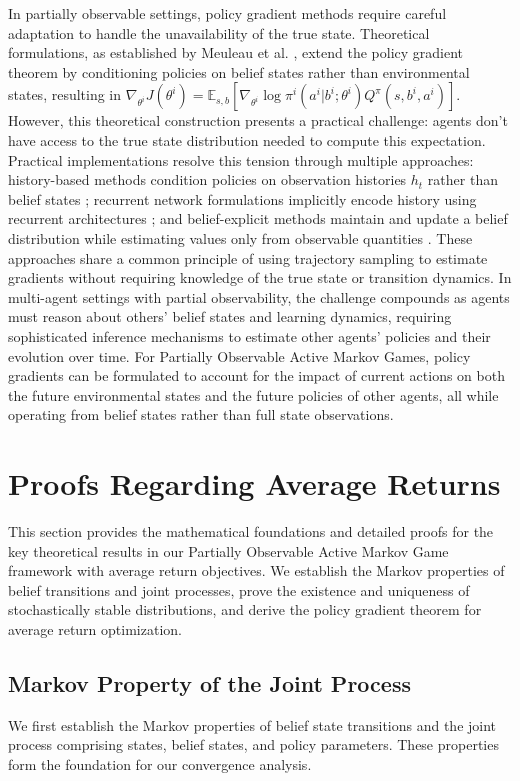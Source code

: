 In partially observable settings, policy gradient methods require careful adaptation to handle the unavailability of the true state. Theoretical formulations, as established by Meuleau et al. \cite{meuleau1999pomdp}, extend the policy gradient theorem by conditioning policies on belief states rather than environmental states, resulting in $\nabla_{\theta^i} J(\theta^i) = \mathbb{E}_{s,b} \left[ \nabla_{\theta^i} \log \pi^i(a^i|b^i; \theta^i) Q^{\pi}(s,b^i,a^i) \right]$. However, this theoretical construction presents a practical challenge: agents don't have access to the true state distribution needed to compute this expectation. Practical implementations resolve this tension through multiple approaches: history-based methods condition policies on observation histories $h_t$ rather than belief states \cite{aberdeen2002pg}; recurrent network formulations implicitly encode history using recurrent architectures \cite{hausknecht2015drqn}; and belief-explicit methods maintain and update a belief distribution while estimating values only from observable quantities \cite{peng2022belief}. These approaches share a common principle of using trajectory sampling to estimate gradients without requiring knowledge of the true state or transition dynamics. In multi-agent settings with partial observability, the challenge compounds as agents must reason about others' belief states and learning dynamics, requiring sophisticated inference mechanisms to estimate other agents' policies and their evolution over time. For Partially Observable Active Markov Games, policy gradients can be formulated to account for the impact of current actions on both the future environmental states and the future policies of other agents, all while operating from belief states rather than full state observations.

\chapter{Proofs Regarding Average Returns}

This section provides the mathematical foundations and detailed proofs for the
key theoretical results in our Partially Observable Active Markov Game framework
with average return objectives. We establish the Markov properties of belief transitions
and joint processes, prove the existence and uniqueness of stochastically stable
distributions, and derive the policy gradient theorem for average return optimization.

\section{Markov Property of the Joint Process}
\label{appendix:stochasticallystable}We first establish the Markov properties of
belief state transitions and the joint process comprising states, belief states,
and policy parameters. These properties form the foundation for our convergence analysis.

